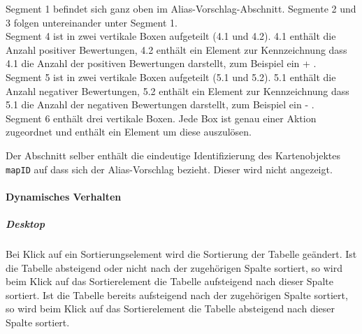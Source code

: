 \vspace{0.5em}
\begin{minipage}{\textwidth}
    \begin{minipage}{.5\textwidth}
        Segment 1 befindet sich ganz oben im Alias-Vorschlag-Abschnitt. Segmente 2 und 3 folgen untereinander unter Segment 1. \\
        Segment 4 ist in  zwei vertikale Boxen aufgeteilt (4.1 und 4.2).
        4.1 enthält die Anzahl positiver Bewertungen, 4.2 enthält ein Element zur Kennzeichnung dass 4.1 die Anzahl der positiven Bewertungen darstellt, zum Beispiel ein \dq + \dq. \\
        Segment 5 ist in  zwei vertikale Boxen aufgeteilt (5.1 und 5.2). 
        5.1 enthält die Anzahl negativer Bewertungen, 5.2 enthält ein Element zur Kennzeichnung dass 5.1 die Anzahl der negativen Bewertungen darstellt, zum Beispiel ein \dq - \dq. \\
        Segment 6 enthält drei vertikale Boxen. Jede Box ist genau einer Aktion zugeordnet und enthält ein Element um diese auszulösen.
    \end{minipage}
    \begin{minipage}{.5\textwidth}
        \hspace{.2\textwidth}
        \captionsetup[figure]{labelformat=empty}
        \captionsetup[figure]{labelformat=default}
    \end{minipage}
\end{minipage}
\vspace{0.5em}

Der Abschnitt selber enthält die eindeutige Identifizierung des Kartenobjektes \verb#mapID# auf dass sich der Alias-Vorschlag bezieht. Dieser wird nicht angezeigt.

\paragraph*{Dynamisches Verhalten}
\subparagraph*{Desktop}
Bei Klick auf ein Sortierungselement wird die Sortierung der Tabelle geändert.
Ist die Tabelle absteigend oder nicht nach der zugehörigen Spalte sortiert, so wird beim Klick auf das Sortierelement die Tabelle aufsteigend nach dieser Spalte sortiert.
Ist die Tabelle bereits aufsteigend nach der zugehörigen Spalte sortiert, so wird beim Klick auf das Sortierelement die Tabelle absteigend nach dieser Spalte sortiert.

